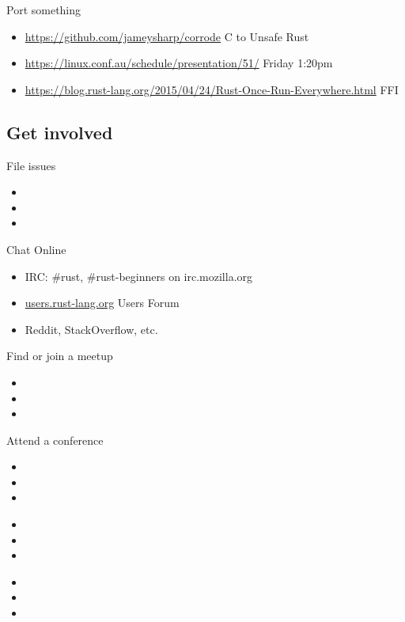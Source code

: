 \documentclass[50pt]{beamer}
\begin{document}
\begin{frame}
    Port something
    \begin{itemize}
        \item \url{https://github.com/jameysharp/corrode} C to Unsafe Rust
        \item \url{https://linux.conf.au/schedule/presentation/51/} Friday 1:20pm
        \item \url{https://blog.rust-lang.org/2015/04/24/Rust-Once-Run-Everywhere.html} FFI
    \end{itemize}
\end{frame}


\subsection{Get involved}

\begin{frame}
    File issues
    \begin{itemize}
        \item
        \item
        \item
    \end{itemize}
\end{frame}

\begin{frame}
    Chat Online
    \begin{itemize}
        \item IRC: \#rust, \#rust-beginners on irc.mozilla.org
        \item \url{users.rust-lang.org} Users Forum
        \item Reddit, StackOverflow, etc.
    \end{itemize}
\end{frame}

\begin{frame}
    Find or join a meetup
    \begin{itemize}
        \item
        \item
        \item
    \end{itemize}
\end{frame}

\begin{frame}
    Attend a conference
    \begin{itemize}
        \item
        \item
        \item
    \end{itemize}
\end{frame}

\begin{frame}
    \begin{itemize}
        \item
        \item
        \item
    \end{itemize}
\end{frame}

\begin{frame}
    \begin{itemize}
        \item
        \item
        \item
    \end{itemize}
\end{frame}
\end{document}
